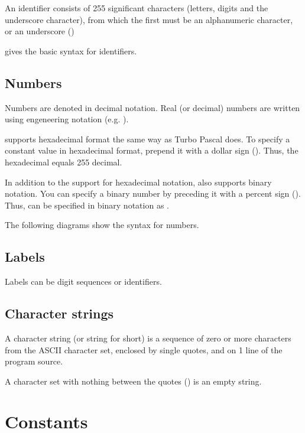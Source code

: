 \documentclass{report}
\begin{document}
An identifier consists of 255 significant characters (letters, digits and
the underscore character), from which the first must be an alphanumeric 
character, or an underscore (\var{\_})

 gives the basic syntax for identifiers.



\section{Numbers}
Numbers are denoted in decimal notation. Real (or decimal) numbers are
written using engeneering notation (e.g. ).

\fpc supports hexadecimal format the same way as Turbo Pascal does. To
specify a constant value in hexadecimal format, prepend it with a dollar
sign (\var{\$}). Thus, the hexadecimal  equals 255 decimal.

In addition to the support for hexadecimal notation, \fpc also supports
binary notation. You can specify a binary number by preceding it with a
percent sign (\var{\%}). Thus,  can be specified in binary notation
as .

The following diagrams show the syntax for numbers.



\section{Labels}

Labels can be digit sequences or identifiers. 


 
\section{Character strings}
A character string (or string for short) is a sequence of zero or more
characters from the ASCII character set, enclosed by single quotes, and on 1
line of the program source.

A character set with nothing between the quotes () is an empty 
string.



\chapter{Constants}
\end{document}
